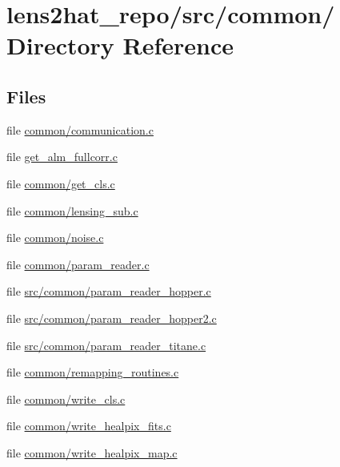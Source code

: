 \section{lens2hat\-\_\-repo/src/common/ Directory Reference}
\label{dir_d99042e9449d4a45ab9103cb51e01429}
\subsection*{Files}
\begin{DoxyCompactItemize}
\item 
file \hyperlink{common_2communication_8c}{common/communication.\-c}
\item 
file \hyperlink{get__alm__fullcorr_8c}{get\-\_\-alm\-\_\-fullcorr.\-c}
\item 
file \hyperlink{common_2get__cls_8c}{common/get\-\_\-cls.\-c}
\item 
file \hyperlink{common_2lensing__sub_8c}{common/lensing\-\_\-sub.\-c}
\item 
file \hyperlink{common_2noise_8c}{common/noise.\-c}
\item 
file \hyperlink{common_2param__reader_8c}{common/param\-\_\-reader.\-c}
\item 
file \hyperlink{src_2common_2param__reader__hopper_8c}{src/common/param\-\_\-reader\-\_\-hopper.\-c}
\item 
file \hyperlink{src_2common_2param__reader__hopper2_8c}{src/common/param\-\_\-reader\-\_\-hopper2.\-c}
\item 
file \hyperlink{src_2common_2param__reader__titane_8c}{src/common/param\-\_\-reader\-\_\-titane.\-c}
\item 
file \hyperlink{common_2remapping__routines_8c}{common/remapping\-\_\-routines.\-c}
\item 
file \hyperlink{common_2write__cls_8c}{common/write\-\_\-cls.\-c}
\item 
file \hyperlink{common_2write__healpix__fits_8c}{common/write\-\_\-healpix\-\_\-fits.\-c}
\item 
file \hyperlink{common_2write__healpix__map_8c}{common/write\-\_\-healpix\-\_\-map.\-c}
\end{DoxyCompactItemize}

